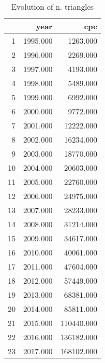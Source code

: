 \begin{table}[ht]
\centering
\begin{tabular}{rrr}
  \hline
 & year & cpc \\ 
  \hline
1 & 1995.000 & 1263.000 \\ 
  2 & 1996.000 & 2269.000 \\ 
  3 & 1997.000 & 4193.000 \\ 
  4 & 1998.000 & 5489.000 \\ 
  5 & 1999.000 & 6992.000 \\ 
  6 & 2000.000 & 9772.000 \\ 
  7 & 2001.000 & 12222.000 \\ 
  8 & 2002.000 & 16234.000 \\ 
  9 & 2003.000 & 18770.000 \\ 
  10 & 2004.000 & 20603.000 \\ 
  11 & 2005.000 & 22760.000 \\ 
  12 & 2006.000 & 24975.000 \\ 
  13 & 2007.000 & 28233.000 \\ 
  14 & 2008.000 & 31214.000 \\ 
  15 & 2009.000 & 34617.000 \\ 
  16 & 2010.000 & 40061.000 \\ 
  17 & 2011.000 & 47604.000 \\ 
  18 & 2012.000 & 57449.000 \\ 
  19 & 2013.000 & 68381.000 \\ 
  20 & 2014.000 & 85811.000 \\ 
  21 & 2015.000 & 110440.000 \\ 
  22 & 2016.000 & 136182.000 \\ 
  23 & 2017.000 & 168102.000 \\ 
   \hline
\end{tabular}
\caption{Evolution of n. triangles} 
\end{table}
